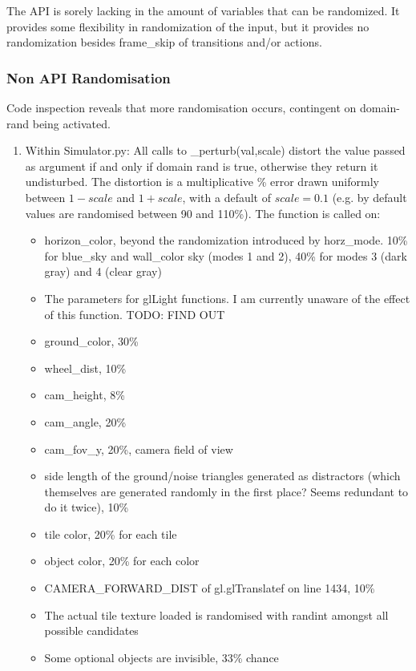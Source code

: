 \documentclass[12pt]{article}
\begin{document}
The API is sorely lacking in the amount of variables that can be randomized. It provides some flexibility in randomization of the input, but it provides no randomization besides frame\_skip of transitions and/or actions.
\subsubsection{Non API Randomisation}
Code inspection reveals that more randomisation occurs, contingent on domain-rand being activated. 
\begin{enumerate}
    \item Within Simulator.py: All calls to \_perturb(val,scale) distort the value passed as argument if and only if domain rand is true, otherwise they return it undisturbed. The distortion is a multiplicative \% error drawn uniformly between $1 - scale$ and $1 + scale$, with a default of $scale = 0.1$ (e.g. by default values are randomised between 90 and 110\%). The function is called on:
    \begin{itemize}
        \item horizon\_color, beyond the randomization introduced by horz\_mode. 10\% for blue\_sky and wall\_color sky (modes 1 and 2), 40\% for modes 3 (dark gray) and 4 (clear gray)
        \item The parameters for glLight functions. I am currently unaware of the effect of this function. TODO: FIND OUT
        \item ground\_color, 30\%
        \item wheel\_dist, 10\%
        \item cam\_height, 8\%
        \item cam\_angle, 20\%
        \item cam\_fov\_y, 20\%, camera field of view
        \item side length of the ground/noise triangles generated as distractors (which themselves are generated randomly in the first place? Seems redundant to do it twice), 10\%
        \item tile color, 20\% for each tile
        \item object color, 20\% for each color
        \item CAMERA\_FORWARD\_DIST of gl.glTranslatef on line 1434, 10\%
        \item The actual tile texture loaded is randomised with randint amongst all possible candidates
        \item Some optional objects are invisible, 33\% chance
    \end{itemize}

\end{enumerate}
\end{document}
